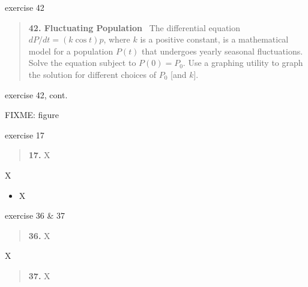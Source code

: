 \documentclass{beamer}
\begin{document}
\begin{frame}{exercise 42}

\begin{quotation}
\noindent \textbf{42.  Fluctuating Population} \, The differential equation $dP/dt = (k \cos t) p$, where $k$ is a positive constant, is a mathematical model for a population $P(t)$ that undergoes yearly seasonal fluctuations.  Solve the equation subject to $P(0)=P_0$.  Use a graphing utility to graph the solution for different choices of $P_0$ [and $k$]. 
\end{quotation}

\vspace{50mm}
\end{frame}


\begin{frame}{exercise 42, cont.}

FIXME: figure
\end{frame}


\begin{frame}{exercise 17}

\begin{quotation}
\noindent \textbf{17.} X
\end{quotation}

\vspace{50mm}
\end{frame}


\begin{frame}{X}

\begin{itemize}
\item X
\end{itemize}
\end{frame}


\begin{frame}{exercise 36 \& 37}

\begin{quotation}
\noindent \textbf{36.} X
\end{quotation}

\vspace{50mm}
\end{frame}


\begin{frame}{X}

\begin{quotation}
\noindent \textbf{37.} X
\end{quotation}

\vspace{50mm}
\end{frame}
\end{document}
